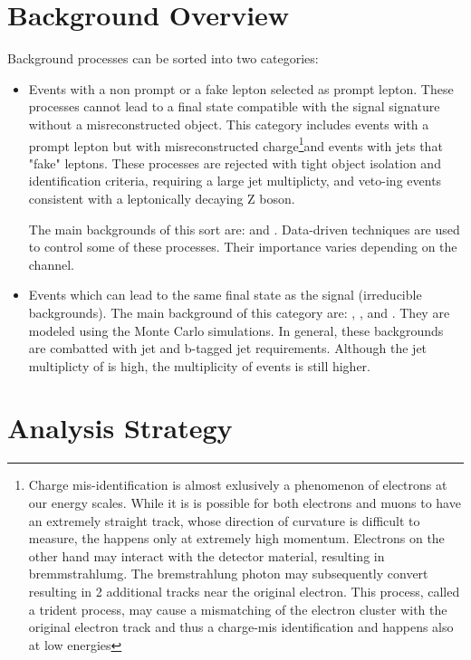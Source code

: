 \section{Background Overview}

Background processes can be sorted into two categories:

\begin{itemize}

\item Events with a non prompt or a fake lepton selected as prompt
  lepton. These processes cannot lead to a final state compatible with the
  signal signature without a misreconstructed object. This category includes
  events with a prompt lepton but with misreconstructed charge\footnote{Charge mis-identification is almost exlusively a phenomenon of electrons at our energy scales. While it is
  is possible for both electrons and muons to have an extremely straight track, whose direction of curvature is difficult to measure, the happens only at extremely high momentum. 
  Electrons on the other hand may interact with the detector material, resulting in bremmstrahlumg. The bremstrahlung photon may subsequently convert resulting in 2 additional
  tracks near the original electron. This process, called a trident process, may cause a mismatching of the electron cluster with the original electron track and thus
  a charge-mis identification and happens also at low energies}and events
  with jets that "fake" leptons.  These processes are rejected with tight object isolation and identification criteria, requiring a large jet multiplicty, and veto-ing events
  consistent with a leptonically decaying Z boson. 

  The main backgrounds of this sort are: \ttbar and \zj.
  Data-driven techniques are used to control some of these processes.
  Their importance varies depending on the channel.

\item Events which can lead to the same final state as the signal (irreducible
  backgrounds).
 The main background of this category are: \ttV, \WZ, and \ZZ.
 They are modeled using the Monte Carlo simulations. In general,
 these backgrounds are combatted with jet and b-tagged jet requirements. 
 Although the jet multiplicty of \ttV is high, the multiplicity of \tth 
 events is still higher. 

\end{itemize}


\section{Analysis Strategy} 


